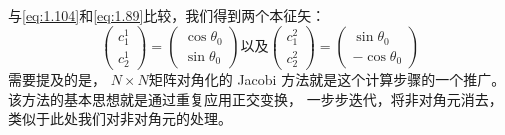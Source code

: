与\autoref{eq:1.104}和\autoref{eq:1.89}比较，我们得到两个本征矢：
\begin{subequations}
 \begin{equation}
     \begin{pmatrix}
      c_1^1 \\ c_2^1 
     \end{pmatrix} = \begin{pmatrix}
      \cos\theta_0 \\ \sin\theta_0
     \end{pmatrix}
     \label{eq:1.107a}
 \end{equation}
 以及
 \begin{equation}
     \begin{pmatrix}
      c_1^2 \\ c_2^2 
     \end{pmatrix} = \begin{pmatrix}
      \sin\theta_0 \\ -\cos\theta_0
     \end{pmatrix}
     \label{eq:1.107b}
 \end{equation}
 \label{eq:1.107}
\end{subequations}
需要提及的是，
$N\times N$矩阵对角化的 Jacobi 方法就是这个计算步骤的一个推广。
该方法的基本思想就是通过重复应用正交变换，
一步步迭代，将非对角元消去，
类似于此处我们对非对角元的处理。





